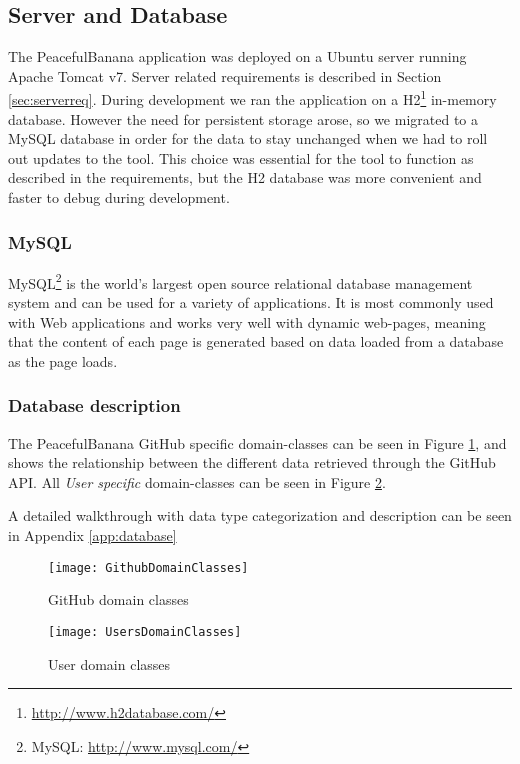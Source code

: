 \subsection{Server and Database}
\label{sec:database}
The PeacefulBanana application was deployed on a Ubuntu server running Apache Tomcat v7. Server related requirements is described in Section \ref{sec:serverreq}.  
During development we ran the application on a H2\footnote{\url{http://www.h2database.com/}} in-memory database. However the need for persistent storage arose, so we migrated to a MySQL database in order for the data to stay unchanged when we had to roll out updates to the tool. This choice was essential for the tool to function as described in the requirements, but the H2 database was more convenient and faster to debug during development.

\subsubsection{MySQL}
\label{sec:mysql}
MySQL\footnote{MySQL: \url{http://www.mysql.com/}} is the world's largest open source relational database management system and can be used for a variety of applications. It is most commonly used with Web applications and works very well with dynamic web-pages, meaning that the content of each page is generated based on data loaded from a database as the page loads.

\subsubsection{Database description}
\label{sec:databasedesc}
The PeacefulBanana GitHub specific domain-classes can be seen in Figure \ref{GithubDomainClasses}, and shows the relationship between the different data retrieved through the GitHub API. 
All \emph{User specific} domain-classes can be seen in Figure \ref{UsersDomainClasses}.

A detailed walkthrough with data type categorization and description can be seen in Appendix \ref{app:database}
\begin{figure}[H]
    \centering
        \texttt{[image: GithubDomainClasses]}
    \caption{GitHub domain classes}
    \label{GithubDomainClasses}
\end{figure}
\begin{figure}[H]
    \centering
        \texttt{[image: UsersDomainClasses]}
    \caption{User domain classes}
    \label{UsersDomainClasses}
\end{figure}
